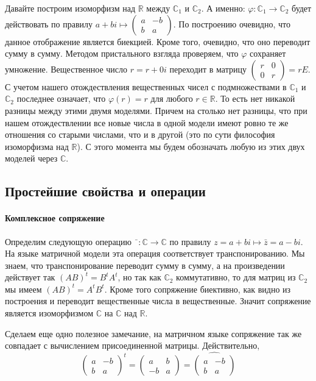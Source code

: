 Давайте построим изоморфизм над $\mathbb R$ между $\mathbb C_1$ и $\mathbb C_2$. А именно: $\varphi\colon \mathbb C_1\to \mathbb C_2$ будет действовать по правилу $a+bi \mapsto \left(\begin{smallmatrix}{a}&{-b}\\{b}&{a}\end{smallmatrix}\right)$. По построению очевидно, что данное отображение является биекцией. Кроме того, очевидно, что оно переводит сумму в сумму. Методом пристального взгляда проверяем, что $\varphi$ сохраняет умножение. Вещественное число $r = r + 0i$ переходит в матрицу $\left(\begin{smallmatrix}{r}&{0}\\{0}&{r}\end{smallmatrix}\right) = rE$. С учетом нашего отождествления вещественных чисел с подмножествами в $\mathbb C_1$ и $\mathbb C_2$ последнее означает, что $\varphi(r) = r$ для любого $r\in\mathbb R$. То есть нет никакой разницы между этими двумя моделями. Причем на столько нет разницы, что при нашем отождествлении все новые числа в одной модели имеют ровно те же отношения со старыми числами, что и в другой (это по сути философия изоморфизма над $\mathbb R$). С этого момента мы будем обозначать любую из этих двух моделей через $\mathbb C$.

\subsection{Простейшие свойства и операции}

\paragraph{Комплексное сопряжение}

Определим следующую операцию $\bar{\phantom{z}}\colon \mathbb C\to \mathbb C$ по правилу $z = a + bi \mapsto \bar z = a - bi$. На языке матричной модели эта операция соответствует транспонированию. Мы знаем, что транспонирование переводит сумму в сумму, а на произведении действует так $(AB)^t = B^t A^t$, но так как $\mathbb C_2$ коммутативно, то для матриц из $\mathbb C_2$ мы имеем $(AB)^t = A^t B^t$. Кроме того сопряжение биективно, как видно из построения и переводит вещественные числа в вещественные. Значит сопряжение является изоморфизмом $\mathbb C$ на $\mathbb C$ над $\mathbb R$.

Сделаем еще одно полезное замечание, на матричном языке сопряжение так же совпадает с вычислением присоединенной матрицы. Действительно,
\[
\begin{pmatrix}
{a}&{-b}\\
{b}&{a}
\end{pmatrix}^t
= 
\begin{pmatrix}
{a}&{b}\\
{-b}&{a}
\end{pmatrix}
=
\widehat{
\begin{pmatrix}
{a}&{-b}\\
{b}&{a}
\end{pmatrix}}
\]

